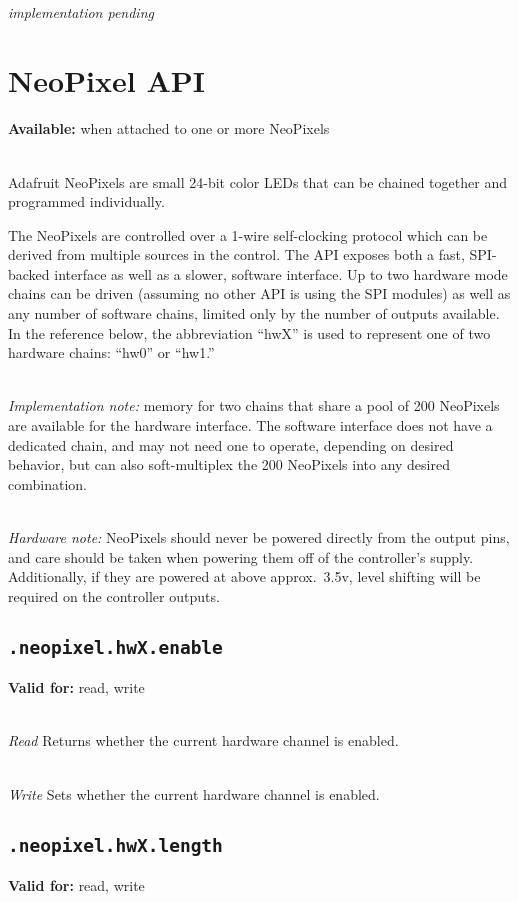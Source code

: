 \documentclass{article}
\begin{document}
~\\
\textit{implementation pending}

\section{NeoPixel API}
\textbf{Available:} when attached to one or more NeoPixels

~\\
Adafruit NeoPixels are small 24-bit color LEDs that can be chained together and programmed individually.

The NeoPixels are controlled over a 1-wire self-clocking protocol which can be derived from multiple sources in the control. The API exposes both a fast, SPI-backed interface as well as a slower, software interface.
Up to two hardware mode chains can be driven (assuming no other API is using the SPI modules) as well as any number of software chains, limited only by the number of outputs available. In the reference below,
the abbreviation ``hwX'' is used to represent one of two hardware chains: ``hw0'' or ``hw1.''

~\\
\textit{Implementation note:} memory for two chains that share a pool of 200 NeoPixels are available for the hardware interface. The software interface does not have a dedicated chain, and
may not need one to operate, depending on desired behavior, but can also soft-multiplex the 200 NeoPixels into any desired combination.

~\\
\textit{Hardware note:} NeoPixels should never be powered directly from the output pins, and care should be taken when powering them off of the controller's supply.
Additionally, if they are powered at above approx.~3.5v, level shifting will be required on the controller outputs.

\subsection{\texttt{.neopixel.hwX.enable}}
\textbf{Valid for:} read, write

~\\
\textit{Read}
Returns whether the current hardware channel is enabled.

~\\
\textit{Write}
Sets whether the current hardware channel is enabled.

\subsection{\texttt{.neopixel.hwX.length}}
\textbf{Valid for:} read, write
\end{document}
